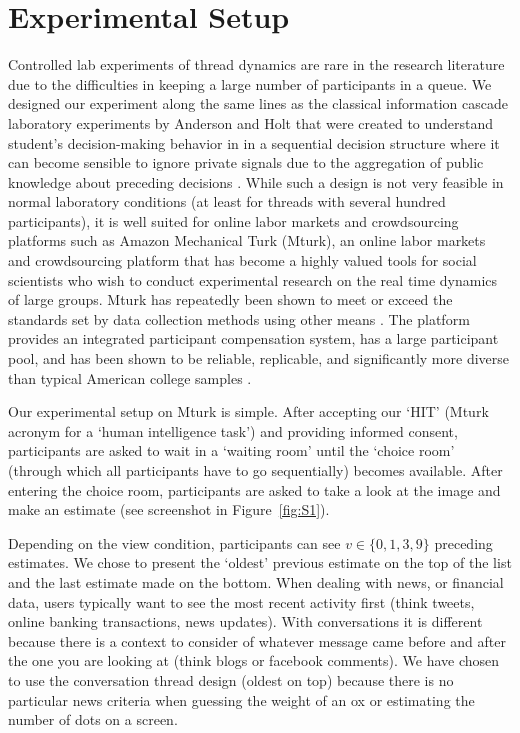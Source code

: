 \documentclass[9pt,a4paper,twocolumn,lineno]{article}
\begin{document}
\section*{Experimental Setup}
Controlled lab experiments of thread dynamics are rare in the research literature due to the difficulties in keeping a large number of participants in a queue. We designed our experiment along the same lines as the classical information cascade laboratory experiments by Anderson and Holt  that were created to understand student's decision-making behavior in in a sequential decision structure where it can become sensible to ignore private signals due to the aggregation of public knowledge about preceding decisions \cite{anderson1997information}. While such a design is not very feasible in normal laboratory conditions (at least for threads with several hundred participants), it is well suited for online labor markets and crowdsourcing platforms such as Amazon Mechanical Turk (Mturk), an online labor markets and crowdsourcing platform that has become a highly valued tools for social scientists who wish to conduct experimental research on the real time dynamics of large groups. Mturk has repeatedly been shown to meet or exceed the standards set by data collection methods using other means \cite{berinsky2012evaluating, buhrmester2018evaluation}. The platform provides an integrated participant compensation system, has a large participant pool, and has been shown to be reliable, replicable, and significantly more diverse than typical American college samples \cite{mason2009financial, buhrmester2011amazon, crump2013evaluating, rand2012promise, horton2011online}.

Our experimental setup on Mturk is simple. After accepting our ‘HIT’ (Mturk acronym for a ‘human intelligence task’) and providing informed consent, participants are asked to wait in a ‘waiting room’ until the ‘choice room’ (through which all participants have to go sequentially) becomes available. After entering the choice room, participants are asked to take a look at the image and make an estimate (see screenshot in Figure~\ref{fig:S1}).

Depending on the view condition, participants can see $v\in\{0,1,3,9\}$ preceding estimates. We chose to present the ‘oldest’ previous estimate on the top of the list and the last estimate made on the bottom. When dealing with news, or financial data, users typically want to see the most recent activity first (think tweets, online banking transactions, news updates). With conversations it is different because there is a context to consider of whatever message came before and after the one you are looking at (think blogs or facebook comments). We have chosen to use the conversation thread design (oldest on top) because there is no particular news criteria when guessing the weight of an ox or estimating the number of dots on a screen.
\end{document}
